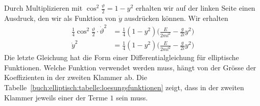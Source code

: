 Durch Multiplizieren mit $\cos^2\frac{\vartheta}{2}=1-y^2$
erhalten wir auf der linken Seite einen Ausdruck, den wir
als Funktion von $\dot{y}$ ausdrücken können.
Wir erhalten
\begin{align*}
\frac14
\cos^2\frac{\vartheta}2
\cdot
\dot{\vartheta}^2
&=
\frac14
(1-y^2)
\biggl(\frac{E}{2ml^2} -\frac{g}{2l}y^2\biggr)
\\
\dot{y}^2
&=
\frac{1}{4}
(1-y^2)
\biggl(\frac{E}{2ml^2} -\frac{g}{2l}y^2\biggr)
\end{align*}
Die letzte Gleichung hat die Form einer Differentialgleichung
für elliptische Funktionen.
Welche Funktion verwendet werden muss, hängt von der Grösse der
Koeffizienten in der zweiten Klammer ab.
Die Tabelle~\ref{buch:elliptisch:tabelle:loesungsfunktionen}
zeigt, dass in der zweiten Klammer jeweils einer der Terme
$1$ sein muss.

%
%
